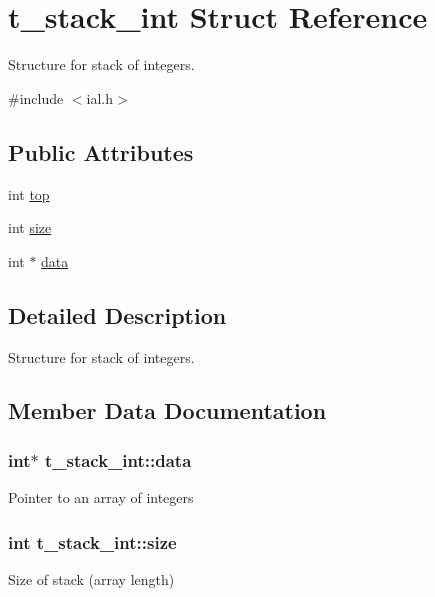 \hypertarget{structt__stack__int}{}\section{t\+\_\+stack\+\_\+int Struct Reference}
\label{structt__stack__int}


Structure for stack of integers.  




{\ttfamily \#include $<$ial.\+h$>$}

\subsection*{Public Attributes}
\begin{DoxyCompactItemize}
\item 
int \hyperlink{structt__stack__int_abedfedc1347b081f09c7d7ce85e12ab4}{top}
\item 
int \hyperlink{structt__stack__int_a4e90bf78700d2e48f141b35ae27127f6}{size}
\item 
int $\ast$ \hyperlink{structt__stack__int_ac2d90194c10e635edf21dcccfddc8c9c}{data}
\end{DoxyCompactItemize}


\subsection{Detailed Description}
Structure for stack of integers. 

\subsection{Member Data Documentation}
\subsubsection[{\texorpdfstring{data}{data}}]{\setlength{\rightskip}{0pt plus 5cm}int$\ast$ t\+\_\+stack\+\_\+int\+::data}\hypertarget{structt__stack__int_ac2d90194c10e635edf21dcccfddc8c9c}{}\label{structt__stack__int_ac2d90194c10e635edf21dcccfddc8c9c}
Pointer to an array of integers 
\subsubsection[{\texorpdfstring{size}{size}}]{\setlength{\rightskip}{0pt plus 5cm}int t\+\_\+stack\+\_\+int\+::size}\hypertarget{structt__stack__int_a4e90bf78700d2e48f141b35ae27127f6}{}\label{structt__stack__int_a4e90bf78700d2e48f141b35ae27127f6}
Size of stack (array length) 
